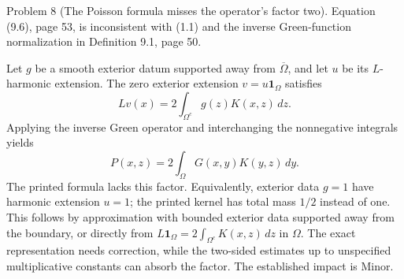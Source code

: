 \documentclass[10pt]{article}
\begin{document}
Problem 8 (The Poisson formula misses the operator’s factor two).  Equation (9.6), page 53, is inconsistent with (1.1) and the inverse Green-function normalization in Definition 9.1, page 50.\par
Let \(g\) be a smooth exterior datum supported away from \(\overline\Omega\), and let \(u\) be its \(L\)-harmonic extension. The zero exterior extension \(v=u\mathbf1_\Omega\) satisfies \[Lv(x)=2\int_{\Omega^c}g(z)K(x,z)\,dz .\] Applying the inverse Green operator and interchanging the nonnegative integrals yields \[P(x,z)=2\int_\Omega G(x,y)K(y,z)\,dy .\] The printed formula lacks this factor. Equivalently, exterior data \(g=1\) have harmonic extension \(u=1\); the printed kernel has total mass \(1/2\) instead of one. This follows by approximation with bounded exterior data supported away from the boundary, or directly from \(L\mathbf1_\Omega=2\int_{\Omega^c}K(x,z)\,dz\) in \(\Omega\). The exact representation needs correction, while the two-sided estimates up to unspecified multiplicative constants can absorb the factor. The established impact is Minor.\par
\end{document}
